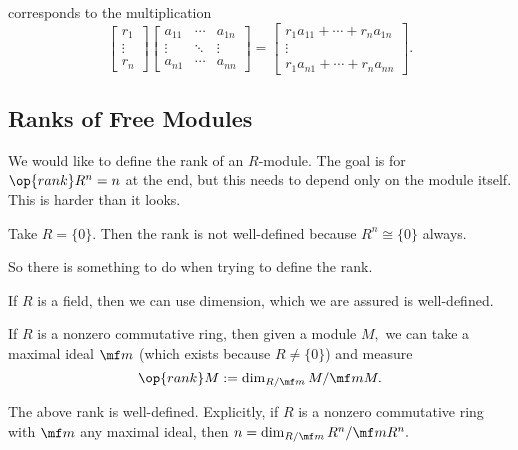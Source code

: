 \documentclass[../notes.tex]{subfiles}
\begin{document}
corresponds to the multiplication
\[\begin{bmatrix}
	r_1 \\ \vdots \\ r_n
\end{bmatrix}\begin{bmatrix}
	a_{11} & \cdots & a_{1n} \\
	\vdots & \ddots & \vdots \\
	a_{n1} & \cdots & a_{nn}
\end{bmatrix}=\begin{bmatrix}
	r_1a_{11} + \cdots + r_na_{1n} \\
	\vdots \\
	r_1a_{n1} + \cdots + r_na_{nn}
\end{bmatrix}.\]

\subsection{Ranks of Free Modules}
We would like to define the rank of an $R$-module. The goal is for $\op{rank}R^n=n$ at the end, but this needs to depend only on the module itself. This is harder than it looks.
\begin{nex}
	Take $R=\{0\}.$ Then the rank is not well-defined because $R^n\cong\{0\}$ always.
\end{nex}
So there is something to do when trying to define the rank.
\begin{example}
	If $R$ is a field, then we can use dimension, which we are assured is well-defined.
\end{example}
\begin{example}
	If $R$ is a nonzero commutative ring, then given a module $M,$ we can take a maximal ideal $\mf m$ (which exists because $R\ne\{0\}$) and measure
	\[\op{rank}M:=\dim_{R/\mf m}M/\mf mM.\]
\end{example}
\begin{proposition}
	The above rank is well-defined. Explicitly, if $R$ is a nonzero commutative ring with $\mf m$ any maximal ideal, then $n=\dim_{R/\mf m}R^n/\mf mR^n.$
\end{proposition}
\end{document}

